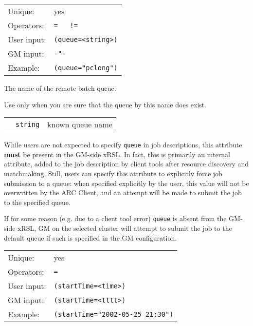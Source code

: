   \hspace*{0.5cm}
  \begin{shaded}
  \end{shaded}
  \begin{tabular}{lp{13cm}}
    Unique:&yes\\
    Operators:&\verb#=   !=#\\
    User input:&\verb#(queue=<string>)#\\
    GM input:&\verb#-"-#\\
    Example:&\verb#(queue="pclong")#\\
  \end{tabular}
  
  The name of the remote batch queue. 

  \begin{framed}
    Use only when you are sure that the queue by this name does exist.
  \end{framed}

  \begin{tabular}{llp{10cm}}
    \hspace*{1cm}&\texttt{string} & known queue name\\
  \end{tabular}

  While users are not expected to specify \texttt{queue} in job descriptions, this attribute \textbf{must} be present in the GM-side xRSL. In fact, this is primarily an internal attribute, added to the job description by client tools after resource discovery and matchmaking. Still, users can specify this attribute to explicitly force job submission to a queue: when specified explicitly by the user, this value will not be overwritten by the ARC Client, and an attempt will be made to submit the job to the specified queue.

  If for some reason (e.g. due to a client tool error) \texttt{queue} is absent from the GM-side xRSL, GM on the selected cluster will attempt to submit the job to the default queue if such is specified in the GM configuration.

  \hspace*{0.5cm}
  \begin{shaded}
  \end{shaded}
  \begin{tabular}{lp{13cm}}
    Unique:&yes\\
    Operators:&\verb#=#\\
    User input:&\verb#(startTime=<time>)#\\
    GM input:&\verb#(startTime=<tttt>)#\\
    Example:&\verb#(startTime="2002-05-25 21:30")#\\
  \end{tabular}

